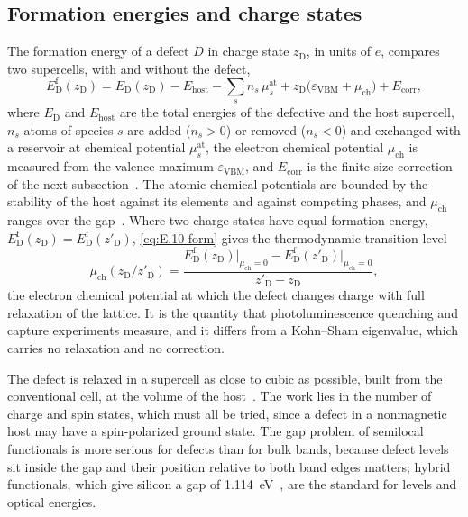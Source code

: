 \subsection{Formation energies and charge states}

The formation energy of a defect $D$ in charge state $z_{\mathrm{D}}$, in units of $e$, compares two supercells, with and without the defect,
\begin{equation}
  E^{\mathrm{f}}_{\mathrm{D}}(z_{\mathrm{D}}) = E_{\mathrm{D}}(z_{\mathrm{D}}) - E_{\mathrm{host}} - \sum_s n_s\,\mu^{\mathrm{at}}_s + z_{\mathrm{D}}\bigl(\varepsilon_{\mathrm{VBM}} + \mu_{\mathrm{ch}}\bigr) + E_{\mathrm{corr}} ,
  \label{eq:E.10-form}
\end{equation}
where $E_{\mathrm{D}}$ and $E_{\mathrm{host}}$ are the total energies of the defective and the host supercell, $n_s$ atoms of species $s$ are added ($n_s > 0$) or removed ($n_s < 0$) and exchanged with a reservoir at chemical potential $\mu^{\mathrm{at}}_s$, the electron chemical potential $\mu_{\mathrm{ch}}$ is measured from the valence maximum $\varepsilon_{\mathrm{VBM}}$, and $E_{\mathrm{corr}}$ is the finite-size correction of the next subsection~\cite[Eq.~(3)]{kim2020quickstart}. The atomic chemical potentials are bounded by the stability of the host against its elements and against competing phases, and $\mu_{\mathrm{ch}}$ ranges over the gap~\cite[Sect.~3]{kim2020quickstart}. Where two charge states have equal formation energy, $E^{\mathrm{f}}_{\mathrm{D}}(z_{\mathrm{D}}) = E^{\mathrm{f}}_{\mathrm{D}}(z'_{\mathrm{D}})$, \cref{eq:E.10-form} gives the thermodynamic transition level
\begin{equation}
  \mu_{\mathrm{ch}}(z_{\mathrm{D}}/z'_{\mathrm{D}}) = \frac{E^{\mathrm{f}}_{\mathrm{D}}(z_{\mathrm{D}})\bigr|_{\mu_{\mathrm{ch}}=0} - E^{\mathrm{f}}_{\mathrm{D}}(z'_{\mathrm{D}})\bigr|_{\mu_{\mathrm{ch}}=0}}{z'_{\mathrm{D}} - z_{\mathrm{D}}} ,
  \label{eq:E.10-level}
\end{equation}
the electron chemical potential at which the defect changes charge with full relaxation of the lattice. It is the quantity that photoluminescence quenching and capture experiments measure, and it differs from a Kohn--Sham eigenvalue, which carries no relaxation and no correction.

The defect is relaxed in a supercell as close to cubic as possible, built from the conventional cell, at the volume of the host~\cite[Sect.~3]{kim2020quickstart}. The work lies in the number of charge and spin states, which must all be tried, since a defect in a nonmagnetic host may have a spin-polarized ground state. The gap problem of semilocal functionals is more serious for defects than for bulk bands, because defect levels sit inside the gap and their position relative to both band edges matters; hybrid functionals, which give silicon a gap of \SI{1.114}{eV}~\cite{dhaliah2022first}, are the standard for levels and optical energies.

